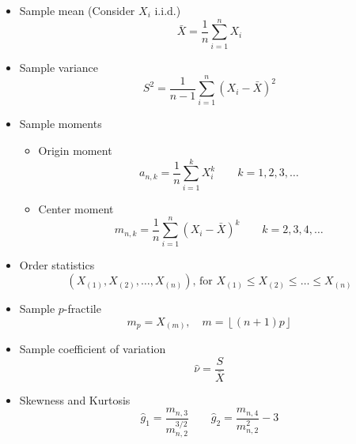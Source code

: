     \begin{itemize}
        \item Sample mean (Consider $X_i$ i.i.d.)
        \begin{equation}
            \bar{X}=\frac{1}{n}\sum_{i=1}^n X_i
        \end{equation}
        \item Sample variance
        \begin{equation}
            S^2=\frac{1}{n-1}\sum_{i=1}^n(X_i-\bar{X})^2  
        \end{equation}
        \item Sample moments
        \begin{itemize}
            \item Origin moment
            \begin{equation}
                a_{n,k}=\frac{1}{n}\sum_{i=1}^k X_i^k\qquad k=1,2,3,\ldots    
            \end{equation}
            \item Center moment
            \begin{equation}
                m_{n,k}=\frac{1}{n}\sum_{i=1}^n (X_i-\bar{X})^k\qquad k=2,3,4,\ldots    
            \end{equation}
        \end{itemize}
        \item Order statistics
        \begin{equation}
            (X_{(1)},X_{(2)},\ldots,X_{(n)}),\,\text{for }X_{(1)}\leq X_{(2)} \leq \ldots\leq X_{(n)}    
        \end{equation}
        \item Sample $p$-fractile
        \begin{equation}
            m_p=X_{(m)},\quad m=\left\lfloor (n+1)p\right\rfloor    
        \end{equation}
        \item Sample coefficient of variation
        \begin{equation}
            \hat{\nu}=\frac{S}{\bar{X}}    
        \end{equation}
        \item Skewness and Kurtosis
        \begin{equation}
            \hat{g}_1=\frac{m_{n,3}}{m_{n,2}^{3/2}}\qquad \hat{g}_2=\frac{m_{n,4}}{m_{n,2}^2}    -3
        \end{equation}
    \end{itemize}

